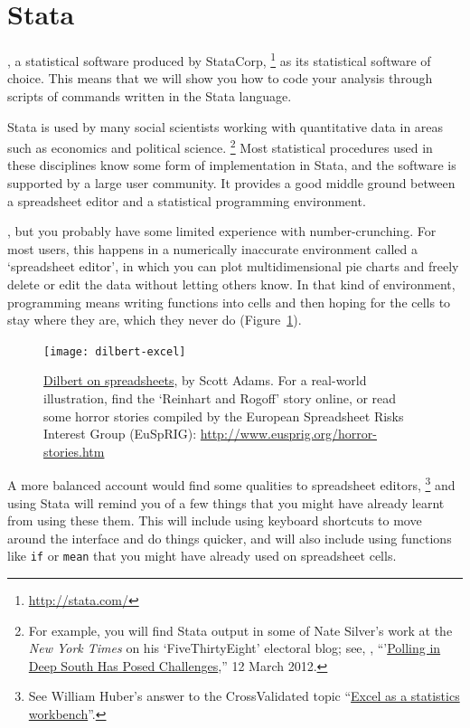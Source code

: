 %
%
\section{Stata}%
  \label{sec:stata}%

, a statistical software produced by StataCorp,%
  \footnote{\url{http://stata.com/}} %
  as its statistical software of choice. This means that we will show you how to code your analysis through scripts of commands written in the Stata language.%

Stata is used by many social scientists working with quantitative data in areas such as economics and political science.%
%
\footnote{For example, you will find Stata output in some of Nate Silver's work at the \emph{New York Times} on his `FiveThirtyEight' electoral blog; see, \eg, ``'\href{http://fivethirtyeight.blogs.nytimes.com/2012/03/12/polling-in-deep-south-has-posed-challenges/}{Polling in Deep South Has Posed Challenges},'' 12 March 2012.} %
%
Most statistical procedures used in these disciplines know some form of implementation in Stata, and the software is supported by a large user community. It provides a good middle ground between a spreadsheet editor and a statistical programming environment.%

%
%
, but you probably have some limited experience with number-crunching. For most users, this happens in a numerically inaccurate environment called a `spreadsheet editor', in which you can plot multidimensional pie charts and freely delete or edit the data without letting others know. In that kind of environment, programming means writing functions into cells and then hoping for the cells to stay where they are, which they never do (Figure~\ref{fig:dilbert-spreadsheets}).%

  \begin{figure}
    \texttt{[image: dilbert-excel]}
    \caption{\href{http://dilbert.com/strips/comic/2007-08-08/}{Dilbert on spreadsheets}, by Scott Adams. For a real-world illustration, find the `Reinhart and Rogoff' story online, or read some horror stories compiled by the European Spreadsheet Risks Interest Group (EuSpRIG):   \url{http://www.eusprig.org/horror-stories.htm}}%
    \label{fig:dilbert-spreadsheets}%
  \end{figure}

  A more balanced account would find some qualities to spreadsheet editors,%
  \footnote{See William Huber's answer to the CrossValidated topic ``\href{http://stats.stackexchange.com/a/3398/3582}{Excel as a statistics workbench}''.} %
   and using Stata will remind you of a few things that you might have already learnt from using these them. This will include using keyboard shortcuts to move around the interface and do things quicker, and will also include using functions like \texttt{if} or \texttt{mean} that you might have already used on spreadsheet cells.%

